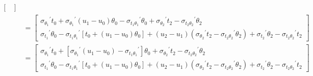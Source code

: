 \documentclass[a4paper,landscape]{article}
\begin{document}
\begin{align*}
\begin{bmatrix}
            \end{bmatrix}
            \\
            &=
            \begin{bmatrix}
                {\sigma_{\theta_1}}^{'}t_0
                + {\sigma_{\theta_1}}^{'}(u_1-u_0)\theta_0
                - {\sigma_{t_1\theta_1}}^{'}\theta_0
                + {\sigma_{\theta_2}}^{'} t_2
                - {\sigma_{t_2\theta_2}}^{'}\theta_2
                \\
                {\sigma_{t_1}}^{'}\theta_0
                - {\sigma_{t_1\theta_1}}^{'}\left[ t_0 + (u_1-u_0)\theta_0 \right]
                + \left(u_2-u_1\right)\left({\sigma_{\theta_2}}^{'} t_2
                - {\sigma_{t_2\theta_2}}^{'}\theta_2\right)
                + {\sigma_{t_2}}^{'}\theta_2
                - {\sigma_{t_2\theta_2}}^{'}t_2
            \end{bmatrix}
            \\
            &=
            \begin{bmatrix}
                {\sigma_{\theta_1}}^{'}t_0
                + \left[ {\sigma_{\theta_1}}^{'}(u_1-u_0) - {\sigma_{t_1\theta_1}}^{'}\right]\theta_0
                + {\sigma_{\theta_2}}^{'} t_2
                - {\sigma_{t_2\theta_2}}^{'}\theta_2
                \\
                {\sigma_{t_1}}^{'}\theta_0
                - {\sigma_{t_1\theta_1}}^{'}\left[ t_0 + (u_1-u_0)\theta_0 \right]
                + \left(u_2-u_1\right)\left({\sigma_{\theta_2}}^{'} t_2
                - {\sigma_{t_2\theta_2}}^{'}\theta_2\right)
                + {\sigma_{t_2}}^{'}\theta_2
                - {\sigma_{t_2\theta_2}}^{'}t_2
            \end{bmatrix}
        \end{align*}
\end{document}
